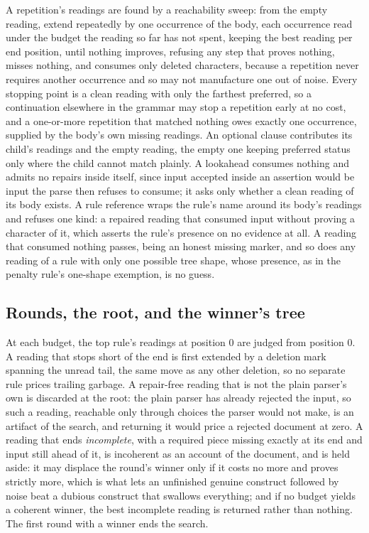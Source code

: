 \documentclass[manuscript]{acmart}
\begin{document}
A repetition's readings are found by a reachability sweep: from the empty reading, extend repeatedly by one occurrence of the body, each occurrence read under the budget the reading so far has not spent, keeping the best reading per end position, until nothing improves, refusing any step that proves nothing, misses nothing, and consumes only deleted characters, because a repetition never requires another occurrence and so may not manufacture one out of noise. Every stopping point is a clean reading with only the farthest preferred, so a continuation elsewhere in the grammar may stop a repetition early at no cost, and a one-or-more repetition that matched nothing owes exactly one occurrence, supplied by the body's own missing readings. An optional clause contributes its child's readings and the empty reading, the empty one keeping preferred status only where the child cannot match plainly. A lookahead consumes nothing and admits no repairs inside itself, since input accepted inside an assertion would be input the parse then refuses to consume; it asks only whether a clean reading of its body exists. A rule reference wraps the rule's name around its body's readings and refuses one kind: a repaired reading that consumed input without proving a character of it, which asserts the rule's presence on no evidence at all. A reading that consumed nothing passes, being an honest missing marker, and so does any reading of a rule with only one possible tree shape, whose presence, as in the penalty rule's one-shape exemption, is no guess.

\subsection{Rounds, the root, and the winner's tree}
\label{sec:root}

At each budget, the top rule's readings at position 0 are judged from position 0. A reading that stops short of the end is first extended by a deletion mark spanning the unread tail, the same move as any other deletion, so no separate rule prices trailing garbage. A repair-free reading that is not the plain parser's own is discarded at the root: the plain parser has already rejected the input, so such a reading, reachable only through choices the parser would not make, is an artifact of the search, and returning it would price a rejected document at zero. A reading that ends \emph{incomplete}, with a required piece missing exactly at its end and input still ahead of it, is incoherent as an account of the document, and is held aside: it may displace the round's winner only if it costs no more and proves strictly more, which is what lets an unfinished genuine construct followed by noise beat a dubious construct that swallows everything; and if no budget yields a coherent winner, the best incomplete reading is returned rather than nothing. The first round with a winner ends the search.
\end{document}
